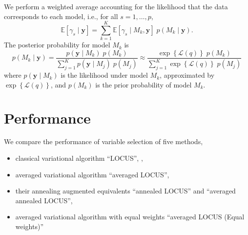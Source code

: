 \documentclass[portrait, a0, 30pt]{sciposter}
\begin{document}
\begin{multicols*}{2}
We perform a weighted average accounting for the likelihood that the data corresponds to each model, i.e., for all $s = 1,\dots,p$, 
\begin{equation*}
\mathbb{E}\left[\gamma_s\mid \boldsymbol{y}\right] = \sum_{k=1}^K\mathbb{E}\left[\gamma_s\mid M_k, \boldsymbol{y}\right]\;p(M_k\mid \boldsymbol{y}).
\end{equation*}
The posterior probability for model $M_k$ is 
\begin{equation*}
p(M_k\mid \boldsymbol{y}) = \frac{p(\boldsymbol{y}\mid M_k)\;p(M_k)}{\sum_{j=1}^K p(\boldsymbol{y}\mid M_j)\; p(M_j)} \approx \frac{\exp\left\lbrace\mathcal{L}(q)\right\rbrace\; p(M_k)}{\sum_{j=1}^K \exp\left\lbrace\mathcal{L}(q)\right\rbrace\; p(M_j)}
\end{equation*}
where $p(\boldsymbol{y}\mid M_k)$ is the likelihood under model $M_k$, approximated by $\exp\left\lbrace\mathcal{L}(q)\right\rbrace$, and $p(M_k)$ is the prior probability of model $M_k$.
\section{Performance}
We compare the performance of variable selection of five methods,
\begin{itemize}
\item classical variational algorithm ``LOCUS'', \citep{eff_inf},
\item averaged variational algorithm ``averaged LOCUS'',
\item their annealing augmented equivalents ``annealed LOCUS'' and ``averaged annealed LOCUS'',
\item averaged variational algorithm with equal weights ``averaged LOCUS (Equal weights)''
\end{itemize}


\end{multicols*}
\end{document}
